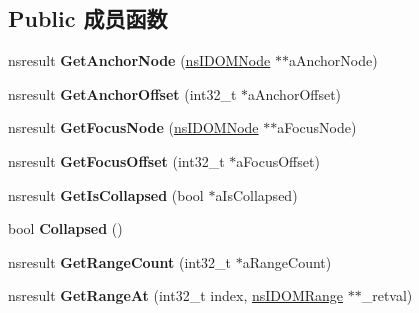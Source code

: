 \subsection*{Public 成员函数}
\begin{DoxyCompactItemize}
\item 
\mbox{\label{interfacens_i_selection_a3d1cec9b1110d131b364bc308aed97b9}} 
nsresult {\bfseries Get\+Anchor\+Node} (\hyperlink{interfacens_i_d_o_m_node}{ns\+I\+D\+O\+M\+Node} $\ast$$\ast$a\+Anchor\+Node)
\item 
\mbox{\label{interfacens_i_selection_a4bfc4cc12f75fba96f460acb51e2ce2c}} 
nsresult {\bfseries Get\+Anchor\+Offset} (int32\+\_\+t $\ast$a\+Anchor\+Offset)
\item 
\mbox{\label{interfacens_i_selection_aa28f57430074a9e9e9375bb8c2c12d14}} 
nsresult {\bfseries Get\+Focus\+Node} (\hyperlink{interfacens_i_d_o_m_node}{ns\+I\+D\+O\+M\+Node} $\ast$$\ast$a\+Focus\+Node)
\item 
\mbox{\label{interfacens_i_selection_a0c180084d241900a20df692ee939f221}} 
nsresult {\bfseries Get\+Focus\+Offset} (int32\+\_\+t $\ast$a\+Focus\+Offset)
\item 
\mbox{\label{interfacens_i_selection_a3bd91451f40af6debea359677341f588}} 
nsresult {\bfseries Get\+Is\+Collapsed} (bool $\ast$a\+Is\+Collapsed)
\item 
\mbox{\label{interfacens_i_selection_ab6bc0de56120f39bc4767e21e51564dc}} 
bool {\bfseries Collapsed} ()
\item 
\mbox{\label{interfacens_i_selection_a17ad090a94cdf5dc13a6ef3f411c87d5}} 
nsresult {\bfseries Get\+Range\+Count} (int32\+\_\+t $\ast$a\+Range\+Count)
\item 
\mbox{\label{interfacens_i_selection_afd6c2b54e4d4af63cd908fa1e05b9ddf}} 
nsresult {\bfseries Get\+Range\+At} (int32\+\_\+t index, \hyperlink{interfacens_i_d_o_m_range}{ns\+I\+D\+O\+M\+Range} $\ast$$\ast$\+\_\+retval)
\item 
\mbox{\label{interfacens_i_selection_a8881eb93e5d63b06e9d2a9c167d980cc}} 
$$
\end{DoxyCompactItemize}
